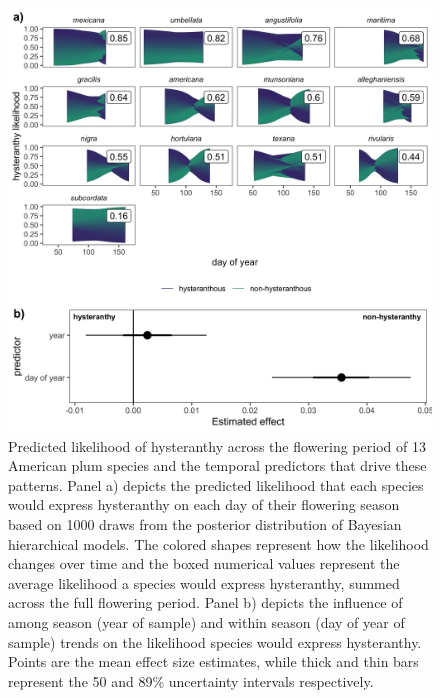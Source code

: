 \documentclass{article}[12pt]
\begin{document}
{\begin{figure}[h!]
    \centering
 \includegraphics[width=\textwidth]{..//..//Plots/whatReviwerswant/sps_preds.jpeg}  %
    \caption{Predicted likelihood of hysteranthy across the flowering period of 13 American plum species and the temporal predictors that drive these patterns. Panel a) depicts the predicted likelihood that each species would express hysteranthy on each day of their flowering season based on 1000 draws from the posterior distribution of Bayesian hierarchical models. The colored shapes represent how the likelihood changes over time and the boxed numerical values represent the average likelihood a species would express hysteranthy, summed across the full flowering period.%
    Panel b) depicts the influence of among season (year of sample) and within season (day of year of sample) trends on the likelihood species would express hysteranthy. Points are the mean effect size estimates, while thick and thin bars represent the 50 and 89\% uncertainty intervals respectively.} 
    


\end{figure}}
\end{document}
